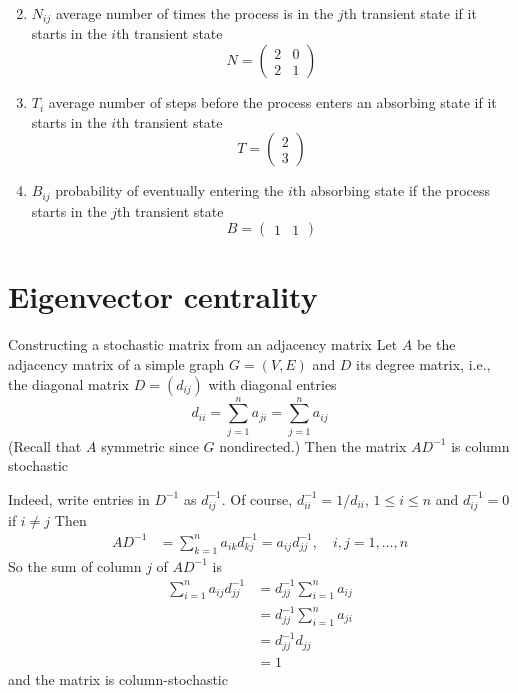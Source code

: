 \documentclass[aspectratio=169]{beamer}
\begin{document}
\begin{frame}
\begin{enumerate}
\setcounter{enumi}{1}
\item $N_{ij}$ average number of times the process is in the $j$th transient state if it starts in the $i$th transient state
\[
N=
\begin{pmatrix}
2 & 0 \\
2 & 1
\end{pmatrix}
\]
\vfill
\item $T_i$ average number of steps before the process enters an absorbing state if it starts in the $i$th transient state
\[
T=\begin{pmatrix}
2\\
3
\end{pmatrix}
\]
\vfill
\item $B_{ij}$ probability of eventually entering the $i$th absorbing state if the process starts in the $j$th transient state
\[
B=
\begin{pmatrix}
	1 & 1
\end{pmatrix}
\]
\end{enumerate}
\vfill
\end{frame}


\section{Eigenvector centrality}

\begin{frame}{Constructing a stochastic matrix from an adjacency matrix}
	Let $A$ be the adjacency matrix of a simple graph $G=(V,E)$ and $D$ its degree matrix, i.e., the diagonal matrix $D=(d_{ij})$ with diagonal entries
	\[
		d_{ii} = \sum_{j=1}^n a_{ji} =\sum_{j=1}^n a_{ij}
	\]
	(Recall that $A$ symmetric since $G$ nondirected.)
	Then the matrix $AD^{-1}$ is column stochastic
\end{frame}

\begin{frame}
	Indeed, write entries in $D^{-1}$ as $d_{ij}^{-1}$. Of course, $d_{ii}^{-1} = 1/d_{ii}$, $1\leq i\leq n$ and $d_{ij}^{-1} = 0$ if $i\neq j$
	\vfill
	Then
	\begin{align*}
		AD^{-1} &= \sum_{k=1}^n a_{ik}d_{kj}^{-1}
		= a_{ij}d_{jj}^{-1}
		,\quad i,j=1,\ldots,n
	\end{align*}
	So the sum of column $j$ of $AD^{-1}$ is 
	\begin{align*}
		\sum_{i=1}^n a_{ij}d_{jj}^{-1} 
		&= d_{jj}^{-1} \sum_{i=1}^n a_{ij} \\
		&= d_{jj}^{-1} \sum_{i=1}^n a_{ji} \\
		&= d_{jj}^{-1} d_{jj} \\
		&= 1
	\end{align*}
	and the matrix is column-stochastic
\end{frame}
	
\end{document}
